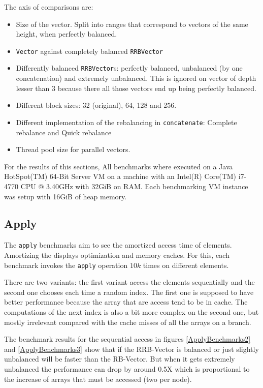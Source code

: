 The axis of comparisons are: 
\begin{itemize}
	\item Size of the vector. Split into ranges that correspond to vectors of the same height, when perfectly balanced.
	\item \texttt{Vector} against completely balanced \texttt{RRBVector}
	\item Differently balanced \texttt{RRBVector}s: perfectly balanced, unbalanced (by one concatenation) and extremely unbalanced. This is ignored on vector of depth lesser than 3 because there all those vectors end up being perfectly balanced.
	\item Different block sizes: 32 (original), 64, 128 and 256.
	\item Different implementation of the rebalancing in \texttt{concatenate}: Complete rebalance and Quick rebalance
	\item Thread pool size for parallel vectors.
\end{itemize}

For the results of this sections, All benchmarks where executed on a Java HotSpot(TM) 64-Bit Server VM on a machine with an Intel(R) Core(TM) i7-4770 CPU @ 3.40GHz with 32GiB on RAM. Each benchmarking VM instance was setup with 16GiB of heap memory. 

\subsection{Apply}
The \texttt{apply} benchmarks aim to see the amortized access time of elements. Amortizing the displays optimization and memory caches. For this, each benchmark invokes the \texttt{apply} operation $10k$ times on different elements. 

There are two variants: the first variant access the elements sequentially and the second one chooses each time a random index. The first one is supposed to have better performance because the array that are access tend to be in cache. The computations of the next index is also a bit more complex on the second one, but mostly irrelevant compared with the cache misses of all the arrays on a branch.

The benchmark results for the sequential access in figures \ref{ApplyBenchmarks2} and \ref{ApplyBenchmarks3} show that if the RRB-Vector is balanced or just slightly unbalanced will be faster than the RB-Vector. But when it gets extremely unbalanced the performance can drop by around 0.5X which is proportional to the increase of arrays that must be accessed (two per node).

